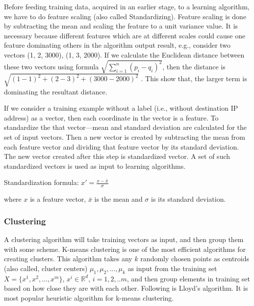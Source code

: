 \documentclass[12pt,oneside,a4paper]{article}
\begin{document}
Before feeding training data, acquired in an earlier stage, to a learning algorithm, we have to do feature scaling (also called Standardizing). Feature scaling is done by subtracting the mean and scaling the feature to a unit variance value. It is necessary because  different features which are at different scales could cause one feature dominating others in the algorithm output result, e.g., consider two vectors (1, 2, 3000), (1, 3, 2000). If we calculate the Euclidean distance between these two vectors using formula $\sqrt{\sum_{i=1}^n (p_i - q_i)^2}$, then the distance is $\sqrt{(1-1)^2 + (2-3)^2 + (3000-2000)^2}$ . This show that, the larger term is dominating the resultant distance.

If we consider a training example without a label (i.e., without destination IP address) as a vector, then each coordinate in the vector is a feature. To standardize the that vector---mean and standard deviation are calculated for the set of input vectors. Then a new vector is created by subtracting the mean from each feature vector and dividing that feature vector by its standard deviation. The new vector created after this step is standardized vector. A set of such standardized vectors is used as input to learning algorithms.

\hspace{2cm} Standardization formula: $x' = \frac{x - \bar{x}}{\sigma}$

where $x$ is a feature vector, ${\bar{x}}$ is the mean and $\sigma$  is its standard deviation.

\subsubsection{Clustering} \label{subsec:Clustering}

A clustering algorithm will take training vectors as input, and then group them with some scheme. K-means\cite{k-means-clustering} clustering is one of the most efficient algorithms for creating clusters. This algorithm takes any $k$ randomly chosen points as centroids (also called, cluster centers) $\mu_{1}, \mu_{2}, ..., \mu_{k}$ as input from the training set $X = \{x^{1}, x^{2}, ..., x^{m}\}$, $x^{i} \in \mathbb{R}^d$, $i= {1,2, ..m}$, and then group elements in training set based on how close they are with each other. Following is Lloyd's algorithm. It is most popular heuristic algorithm for k-means clustering.
\end{document}
